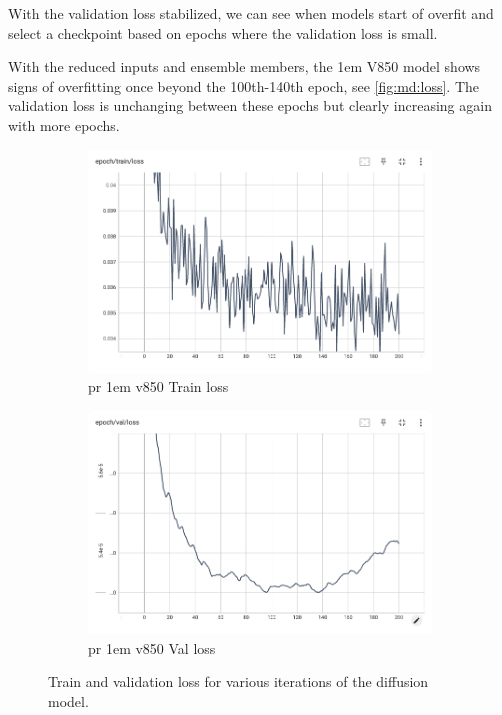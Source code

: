 With the validation loss stabilized, we can see when models start of overfit and select a checkpoint based on epochs where the validation loss is small.

With the reduced inputs and ensemble members, the 1em V850 model shows signs of overfitting once beyond the 100th-140th epoch, see \autoref{fig:md:loss}. The validation loss is unchanging between these epochs but clearly increasing again with more epochs.

\begin{figure}
  \centering
  \begin{subfigure}[b]{0.4\textwidth}
    \centering
    \includegraphics[width=\textwidth]{chapters/figures/3_md/loss/pr-1em-v850-train-loss.png}
      \caption{pr 1em v850 Train loss}
      \label{fig:md:1em-v850-train-loss}
  \end{subfigure}
  \hfill
  \begin{subfigure}[b]{0.4\textwidth}
      \centering
      \includegraphics[width=\textwidth]{chapters/figures/3_md/loss/pr-1em-v850-val-loss.png}
      \caption{pr 1em v850 Val loss}
      \label{fig:md:1em-v850-val-loss}
  \end{subfigure}
  \hfill
  \caption{Train and validation loss for various iterations of the diffusion model.}
  \label{fig:md:loss}
\end{figure}


